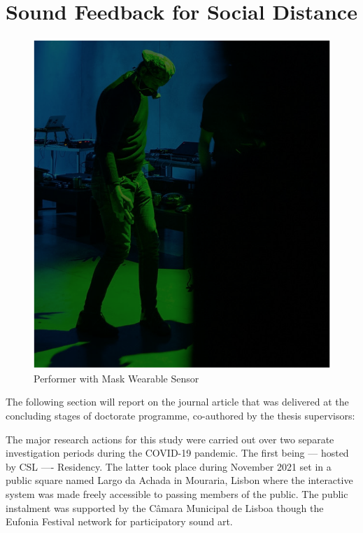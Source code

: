 
\section{Sound Feedback for Social Distance}
\label{case_studies:adse_ess}

\begin{figure}[!h]
\captionsetup{width=1.0\textwidth}
\centering
\includegraphics[width=0.75
\textwidth,keepaspectratio]{Chapters/Figures/adse_ess/CSL_MASK_MICK.png}
{\caption{Performer with Mask Wearable Sensor
}\label{fig:sensor_model}}
\end{figure}

The following section will report on the journal article that was delivered at the concluding stages of doctorate programme, co-authored by the thesis supervisors: 


The major research actions for this study were carried out over two separate investigation periods during the COVID-19 pandemic. The first being --- hosted by CSL ---- Residency. The latter took place during November 2021 set in a public square named Largo da Achada in Mouraria, Lisbon where the interactive system was made freely accessible to passing members of the public. The public instalment was supported by the Câmara Municipal de Lisboa though the Eufonia Festival network for participatory sound art. 

